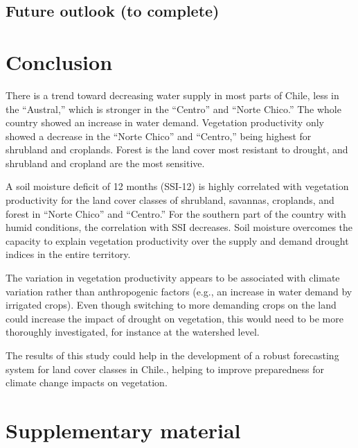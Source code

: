 \documentclass[
  authoryear,
  preprint,
  3p,
  onecolumn]{elsarticle}
\begin{document}
\hypertarget{future-outlook-to-complete}{%
\subsection{Future outlook (to
complete)}\label{future-outlook-to-complete}}

\hypertarget{conclusion}{%
\section{Conclusion}\label{conclusion}}

There is a trend toward decreasing water supply in most parts of Chile,
less in the ``Austral,'' which is stronger in the ``Centro'' and ``Norte
Chico.'' The whole country showed an increase in water demand.
Vegetation productivity only showed a decrease in the ``Norte Chico''
and ``Centro,'' being highest for shrubland and croplands. Forest is the
land cover most resistant to drought, and shrubland and cropland are the
most sensitive.

A soil moisture deficit of 12 months (SSI-12) is highly correlated with
vegetation productivity for the land cover classes of shrubland,
savannas, croplands, and forest in ``Norte Chico'' and ``Centro.'' For
the southern part of the country with humid conditions, the correlation
with SSI decreases. Soil moisture overcomes the capacity to explain
vegetation productivity over the supply and demand drought indices in
the entire territory.

The variation in vegetation productivity appears to be associated with
climate variation rather than anthropogenic factors (e.g., an increase
in water demand by irrigated crops). Even though switching to more
demanding crops on the land could increase the impact of drought on
vegetation, this would need to be more thoroughly investigated, for
instance at the watershed level.

The results of this study could help in the development of a robust
forecasting system for land cover classes in Chile., helping to improve
preparedness for climate change impacts on vegetation.

\hypertarget{supplementary-material}{%
\section*{Supplementary material}\label{supplementary-material}}


\renewcommand\refname{References}
  
\end{document}
